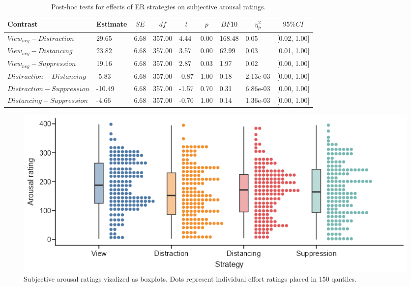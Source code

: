 \documentclass[
  man,floatsintext]{apa6}
\begin{document}
\begin{table}[H]

\begin{center}
\begin{threeparttable}

\caption{\label{tab:SupplEffectArousalReg}Post-hoc tests for effects of ER strategies on subjective arousal ratings.}

\footnotesize{

\begin{tabular}{lllllllll}
\toprule
Contrast & \multicolumn{1}{c}{Estimate} & \multicolumn{1}{c}{$SE$} & \multicolumn{1}{c}{$df$} & \multicolumn{1}{c}{$t$} & \multicolumn{1}{c}{$p$} & \multicolumn{1}{c}{$BF10$} & \multicolumn{1}{c}{$\eta_{p}^{2}$} & \multicolumn{1}{c}{$95\% CI$}\\
\midrule
$View_{neg} - Distraction$ & 29.65 & 6.68 & 357.00 & 4.44 & 0.00 & 168.48 & 0.05 & {}[0.02, 1.00]\\
$View_{neg} - Distancing$ & 23.82 & 6.68 & 357.00 & 3.57 & 0.00 & 62.99 & 0.03 & {}[0.01, 1.00]\\
$View_{neg} - Suppression$ & 19.16 & 6.68 & 357.00 & 2.87 & 0.03 & 1.97 & 0.02 & {}[0.00, 1.00]\\
$Distraction - Distancing$ & -5.83 & 6.68 & 357.00 & -0.87 & 1.00 & 0.18 & 2.13e-03 & {}[0.00, 1.00]\\
$Distraction - Suppression$ & -10.49 & 6.68 & 357.00 & -1.57 & 0.70 & 0.31 & 6.86e-03 & {}[0.00, 1.00]\\
$Distancing - Suppression$ & -4.66 & 6.68 & 357.00 & -0.70 & 1.00 & 0.14 & 1.36e-03 & {}[0.00, 1.00]\\
\bottomrule
\end{tabular}

}

\end{threeparttable}
\end{center}

\end{table}

\begin{figure}[H]
\includegraphics[width=\textwidth]{figures/FigSubjArousal} \caption{Subjective arousal ratings vizalized as boxplots. Dots represent individual effort ratings placed in 150 qantiles.}\label{fig:SupplFigArousalReg}
\end{figure}
\end{document}
